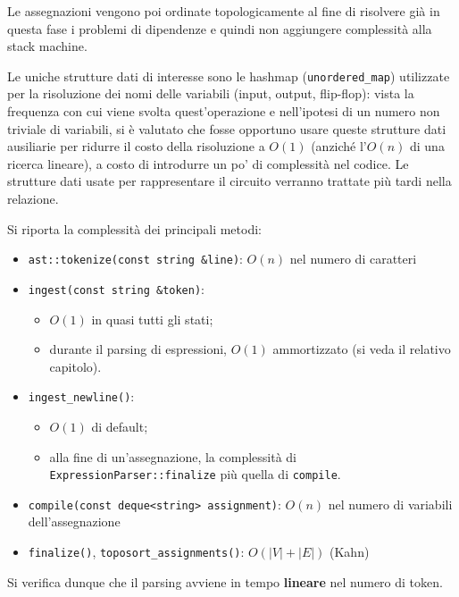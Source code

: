 \documentclass[12pt]{article}
\begin{document}
Le assegnazioni vengono poi ordinate topologicamente al fine di
risolvere già in questa fase i problemi di dipendenze e quindi non
aggiungere complessità alla stack machine.

Le uniche strutture dati di interesse sono le hashmap
(\texttt{unordered\_map}) utilizzate per la risoluzione dei nomi delle
variabili (input, output, flip-flop): vista la frequenza con cui viene
svolta quest'operazione e nell'ipotesi di un numero non triviale di
variabili, si è valutato che fosse opportuno usare queste strutture dati
ausiliarie per ridurre il costo della risoluzione a \(O(1)\) (anziché
l'\(O(n)\) di una ricerca lineare), a costo di introdurre un po' di
complessità nel codice. Le strutture dati usate per rappresentare il
circuito verranno trattate più tardi nella relazione.

Si riporta la complessità dei principali metodi:

\begin{itemize}
\item
  \texttt{ast::tokenize(const\ string\ \&line)}: \(O(n)\) nel numero di
  caratteri
\item
  \texttt{ingest(const\ string\ \&token)}:

  \begin{itemize}
  \item
    \(O(1)\) in quasi tutti gli stati;
  \item
    durante il parsing di espressioni, \(O(1)\) ammortizzato (si veda il
    relativo capitolo).
  \end{itemize}
\item
  \texttt{ingest\_newline()}:

  \begin{itemize}
  \item
    \(O(1)\) di default;
  \item
    alla fine di un'assegnazione, la complessità di
    \texttt{ExpressionParser::finalize} più quella di \texttt{compile}.
  \end{itemize}
\item
  \texttt{compile(const\ deque\textless{}string\textgreater{}\ assignment)}:
  \(O(n)\) nel numero di variabili dell'assegnazione
\item
  \texttt{finalize()}, \texttt{toposort\_assignments()}:
  \(O(|V| + |E|)\) (Kahn)
\end{itemize}

Si verifica dunque che il parsing avviene in tempo \textbf{lineare} nel
numero di token.
\end{document}
